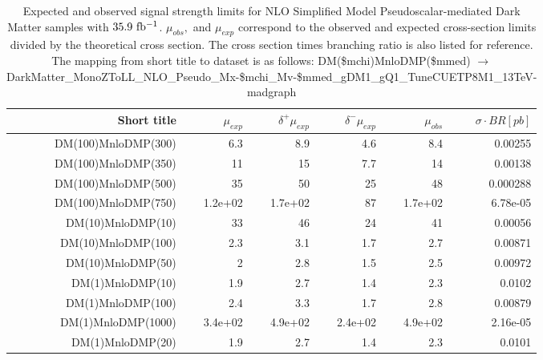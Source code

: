 \begin{table}[hbtp]
  \caption{
    Expected and observed signal strength limits for NLO Simplified Model Pseudoscalar-mediated Dark Matter samples with $35.9~\mathrm{fb^{-1}}$.
    $\mu_{obs},$ and $\mu_{exp}$ correspond to the observed and expected cross-section limits divided by the theoretical cross section.
    The cross section times branching ratio is also listed for reference.
    The mapping from short title to dataset is as follows:
    {\footnotesize DM(\$mchi)MnloDMP(\$mmed) $\rightarrow$ DarkMatter\_MonoZToLL\_NLO\_Pseudo\_Mx-\$mchi\_Mv-\$mmed\_gDM1\_gQ1\_TuneCUETP8M1\_13TeV-madgraph }
  }
  \label{tab:pseudoscalar_limits}
  \begin{center}
{\footnotesize
  \begin{tabular}{rrrrrr}
\hline 
Short title               & $\mu_{exp}$  & $\delta^{+}\mu_{exp}$ & $\delta^{-}\mu_{exp}$ & $\mu_{obs}$  & $\sigma \cdot BR [pb]$ \\
\hline
DM(100)MnloDMP(300)       & 6.3          & 8.9          & 4.6          & 8.4          & 0.00255         \\
DM(100)MnloDMP(350)       & 11           & 15           & 7.7          & 14           & 0.00138         \\
DM(100)MnloDMP(500)       & 35           & 50           & 25           & 48           & 0.000288        \\
DM(100)MnloDMP(750)       & 1.2e+02      & 1.7e+02      & 87           & 1.7e+02      & 6.78e-05        \\
DM(10)MnloDMP(10)         & 33           & 46           & 24           & 41           & 0.00056         \\
DM(10)MnloDMP(100)        & 2.3          & 3.1          & 1.7          & 2.7          & 0.00871         \\
DM(10)MnloDMP(50)         & 2            & 2.8          & 1.5          & 2.5          & 0.00972         \\
DM(1)MnloDMP(10)          & 1.9          & 2.7          & 1.4          & 2.3          & 0.0102          \\
DM(1)MnloDMP(100)         & 2.4          & 3.3          & 1.7          & 2.8          & 0.00879         \\
DM(1)MnloDMP(1000)        & 3.4e+02      & 4.9e+02      & 2.4e+02      & 4.9e+02      & 2.16e-05        \\
DM(1)MnloDMP(20)          & 1.9          & 2.7          & 1.4          & 2.3          & 0.0101          \\

\end{tabular}}
\end{center}
\end{table}
